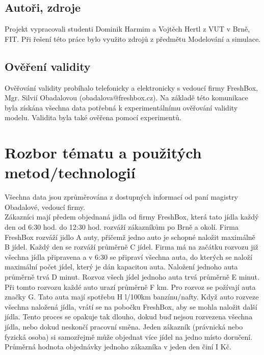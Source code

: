\documentclass[a4paper, 11pt]{article}
\begin{document}
	\subsection{Autoři, zdroje}

	Projekt vypracovali studenti Dominik Harmim a Vojtěch Hertl z VUT v Brně, FIT. Při řešení této práce bylo využito zdrojů z předmětu Modelování a simulace.

	\subsection{Ověření validity}

	Ověřování validity probíhalo telefonicky a elektronicky s vedoucí firmy FreshBox, Mgr. Silvií Obadalovou (obadalova@freshbox.cz). Na základě této komunikace byla získána všechna data potřebná k experimentálnímu ověřování validity modelu. Validita byla také ověřena pomocí experimentů.
	\clearpage


	\section{Rozbor tématu a použitých metod/technologií}

	Všechna data jsou zprůměrována z dostupných informací od paní magistry Obadalové, vedoucí firmy. \\

	Zákazníci mají předem objednaná jidla od firmy FreshBox, která tato jídla každý den od 6:30 hod. do 12:30 hod. rozváží zákazníkům po Brně a okolí. Firma FreshBox rozváží jidlo A auty, přičemž jedno auto je schopné naložit maximálně B jídel. Každý den se rozváží průměrně C jídel. Firma má na začátku rozvozu již všechna jídla připravena a v 6:30 se připraví všechna auta, do kterých se naloží maximální počet jídel, který je dán kapacitou auta. Naložení jednoho auta průměrně trvá D minut. Rozvoz všech jídel jednoho auta trvá průměrně E minut. Při tomto rozvozu každé auto urazí průměrně F km. Pro rozvoz se požívají auta značky G. Tato auta mají spotřebu H l/100km banzínu/nafty. Když auto rozveze všechna naložená jídla, vrátí se na pobočku FreshBox, aby se mohla naložit další jídla. Tento proces se opakuje tak dlouho, dokud buď nejsou rozvezena všechna jídla, nebo dokud neskončí pracovní směna. Jeden zákazník (právnická nebo fyzická osoba) si samozřejmě může objednat více jídel na jedno místo doručení. Průměrná hodnota objednávky jednoho zákazníka v jeden den činí I Kč.
\end{document}
